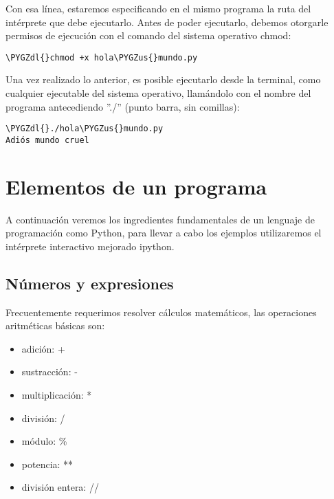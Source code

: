 \documentclass[a4paper,12pt,spanish]{sphinxmanual}
\def\PYGZus{\char`\_}
\def\PYGZdl{\char`\$}
\begin{document}
Con esa línea, estaremos especificando en el mismo programa la ruta del
intérprete que debe ejecutarlo. Antes de poder ejecutarlo, debemos
otorgarle permisos de ejecución con el comando del sistema operativo
chmod:

\begin{Verbatim}[commandchars=\\\{\}]
\PYGZdl{}chmod +x hola\PYGZus{}mundo.py
\end{Verbatim}

Una vez realizado lo anterior, es posible ejecutarlo desde la terminal,
como cualquier ejecutable del sistema operativo, llamándolo con el
nombre del programa antecediendo ''./'' (punto barra, sin comillas):

\begin{Verbatim}[commandchars=\\\{\}]
\PYGZdl{}./hola\PYGZus{}mundo.py
Adiós mundo cruel
\end{Verbatim}


\section{Elementos de un programa}
\label{Unidad01:elementos-de-un-programa}
A continuación veremos los ingredientes fundamentales de un lenguaje de
programación como Python, para llevar a cabo los ejemplos utilizaremos
el intérprete interactivo mejorado ipython.


\subsection{Números y expresiones}
\label{Unidad01:numeros-y-expresiones}
Frecuentemente requerimos resolver cálculos matemáticos, las operaciones
aritméticas básicas son:
\begin{itemize}
\item {} 
adición: +

\item {} 
sustracción: -

\item {} 
multiplicación: *

\item {} 
división: /

\item {} 
módulo: \%

\item {} 
potencia: **

\item {} 
división entera: //

\end{itemize}
\end{document}
